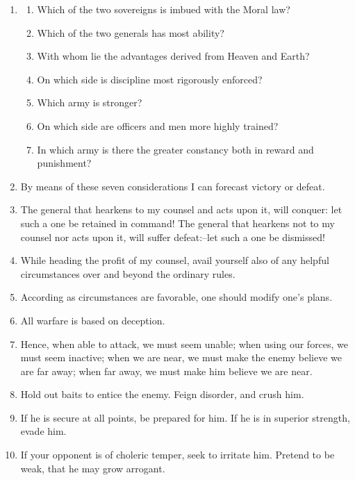 \begin{enumerate}
\item
  \begin{enumerate}
    \item Which of the two sovereigns is imbued with the Moral law? \item
    Which of the two generals has most ability? \item With whom lie the
    advantages derived from Heaven and Earth? \item On which side is
    discipline most rigorously enforced? \item Which army is stronger?
    \item On which side are officers and men more highly trained? \item In
    which army is there the greater constancy both in reward and
    punishment?
  \end{enumerate}


\item By means of these seven considerations I can
    forecast victory or defeat.

\item The general that hearkens to my counsel and acts
    upon it, will conquer:  let such a one be retained in command! 
    The general that hearkens not to my counsel nor acts upon it,
    will suffer defeat:--let such a one be dismissed!

\item While heading the profit of my counsel,
    avail yourself also of any helpful circumstances
    over and beyond the ordinary rules.

\item According as circumstances are favorable,
    one should modify one's plans.

\item All warfare is based on deception.

\item Hence, when able to attack, we must seem unable;
    when using our forces, we must seem inactive; when we
    are near, we must make the enemy believe we are far away;
    when far away, we must make him believe we are near.

\item Hold out baits to entice the enemy.  Feign disorder,
    and crush him.

\item If he is secure at all points, be prepared for him. 
    If he is in superior strength, evade him.

\item If your opponent is of choleric temper, seek to
    irritate him.  Pretend to be weak, that he may grow arrogant.


\end{enumerate}
